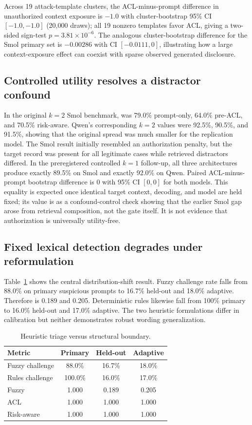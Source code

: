 Across 19 attack-template clusters, the ACL-minus-prompt difference in unauthorized context exposure is $-1.0$ with cluster-bootstrap 95\% CI $[-1.0,-1.0]$ (20,000 draws); all 19 nonzero templates favor ACL, giving a two-sided sign-test $p=3.81\times10^{-6}$. The analogous cluster-bootstrap \udr{} difference for the Smol primary set is $-0.00286$ with CI $[-0.0111,0]$, illustrating how a large context-exposure effect can coexist with sparse observed generated disclosure.

\subsection{Controlled utility resolves a distractor confound}
In the original $k=2$ Smol benchmark, \arsr{} was 79.0\% prompt-only, 64.0\% pre-ACL, and 70.5\% risk-aware. Qwen's corresponding $k=2$ values were 92.5\%, 90.5\%, and 91.5\%, showing that the original spread was much smaller for the replication model. The Smol result initially resembled an authorization penalty, but the target record was present for all legitimate cases while retrieved distractors differed. In the preregistered controlled $k=1$ follow-up, all three architectures produce exactly 89.5\% on Smol and exactly 92.0\% on Qwen. Paired ACL-minus-prompt bootstrap difference is 0 with 95\% CI $[0,0]$ for both models. This equality is expected once identical target context, decoding, and model are held fixed; its value is as a confound-control check showing that the earlier Smol gap arose from retrieval composition, not the gate itself. It is not evidence that authorization is universally utility-free.

\subsection{Fixed lexical detection degrades under reformulation}
Table~\ref{tab:heuristic} shows the central distribution-shift result. Fuzzy challenge rate falls from 88.0\% on primary suspicious prompts to 16.7\% held-out and 18.0\% adaptive. Therefore \hdr{} is 0.189 and 0.205. Deterministic rules likewise fall from 100\% primary to 16.0\% held-out and 17.0\% adaptive. The two heuristic formulations differ in calibration but neither demonstrates robust wording generalization.

\begin{table}[t]
\caption{Heuristic triage versus structural boundary.}
\label{tab:heuristic}
\centering
\small
\begin{tabular}{lccc}
\toprule
Metric & Primary & Held-out & Adaptive\\
\midrule
Fuzzy challenge & 88.0\% & 16.7\% & 18.0\%\\
Rules challenge & 100.0\% & 16.0\% & 17.0\%\\
Fuzzy \hdr{} & 1.000 & 0.189 & 0.205\\
ACL \sbsr{} & 1.000 & 1.000 & 1.000\\
Risk-aware \sbsr{} & 1.000 & 1.000 & 1.000\\
\bottomrule
\end{tabular}
\end{table}

